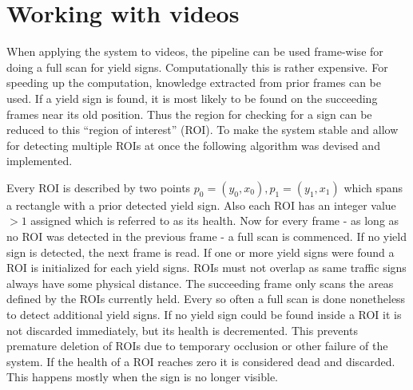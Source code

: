\documentclass{report}
\begin{document}
\section{Working with videos}

When applying the system to videos, the pipeline can be used
frame-wise for doing a full scan for yield signs. Computationally this
is rather expensive. For speeding up the computation, knowledge
extracted from prior frames can be used. If a yield sign is found, it
is most likely to be found on the succeeding frames near its old
position. Thus the region for checking for a sign can be reduced to
this ``region of interest'' (ROI). To make the system stable and allow
for detecting multiple ROIs at once the following algorithm was
devised and implemented.

Every ROI is described by two points \( p_0 = (y_0, x_0), p_1 = (y_1,
x_1) \) which spans a rectangle with a prior detected yield sign. Also
each ROI has an integer value \( > 1 \) assigned which is referred to
as its health. Now for every frame - as long as no ROI was detected in
the previous frame - a full scan is commenced. If no yield sign is
detected, the next frame is read. If one or more yield signs were
found a ROI is initialized for each yield signs. ROIs must not overlap
as same traffic signs always have some physical distance. The
succeeding frame only scans the areas defined by the ROIs currently
held. Every so often a full scan is done nonetheless to detect
additional yield signs. If no yield sign could be found inside a ROI
it is not discarded immediately, but its health is decremented. This
prevents premature deletion of ROIs due to temporary occlusion or
other failure of the system. If the health of a ROI reaches zero it is
considered dead and discarded. This happens mostly when the sign is no
longer visible.
\end{document}
